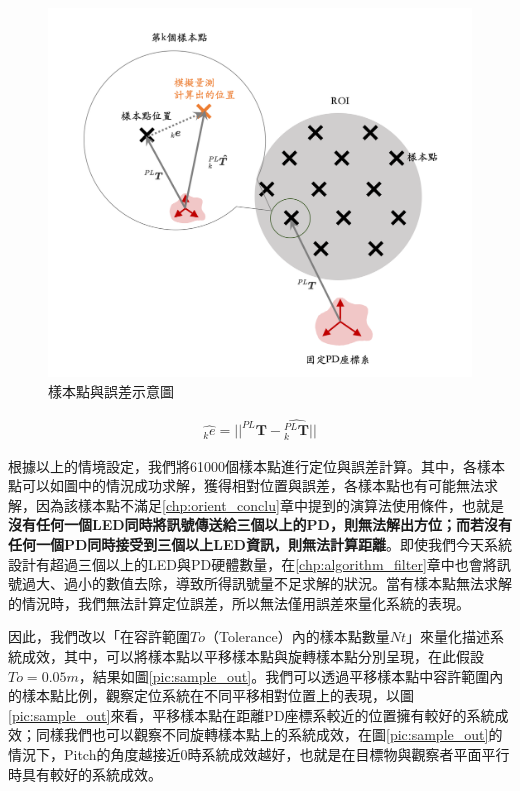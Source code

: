 \begin{figure}[htpb]
    \centering
    \includegraphics[width=13cm]{ch4pic/error.png}
    \caption{樣本點與誤差示意圖}
    \label{pic:error_show}
\end{figure}

\begin{gather}
    \label{eqn:sample_error}
    \hat{_k e} = ||^{PL}\boldsymbol{T}-\hat{^{PL}_k\boldsymbol{T}}||
\end{gather}



根據以上的情境設定，我們將61000個樣本點進行定位與誤差計算。其中，各樣本點可以如圖中的情況成功求解，獲得相對位置與誤差，各樣本點也有可能無法求解，因為該樣本點不滿足\ref{chp:orient_conclu}章中提到的演算法使用條件，也就是\textbf{沒有任何一個LED同時將訊號傳送給三個以上的PD，則無法解出方位；而若沒有任何一個PD同時接受到三個以上LED資訊，則無法計算距離}。即使我們今天系統設計有超過三個以上的LED與PD硬體數量，在\ref{chp:algorithm_filter}章中也會將訊號過大、過小的數值去除，導致所得訊號量不足求解的狀況。當有樣本點無法求解的情況時，我們無法計算定位誤差，所以無法僅用誤差來量化系統的表現。



因此，我們改以「在容許範圍$To$（Tolerance）內的樣本點數量$Nt$」來量化描述系統成效，其中，可以將樣本點以平移樣本點與旋轉樣本點分別呈現，在此假設$To=0.05m$，結果如圖\ref{pic:sample_out}。我們可以透過平移樣本點中容許範圍內的樣本點比例，觀察定位系統在不同平移相對位置上的表現，以圖\ref{pic:sample_out}來看，平移樣本點在距離PD座標系較近的位置擁有較好的系統成效；同樣我們也可以觀察不同旋轉樣本點上的系統成效，在圖\ref{pic:sample_out}的情況下，Pitch的角度越接近0時系統成效越好，也就是在目標物與觀察者平面平行時具有較好的系統成效。

